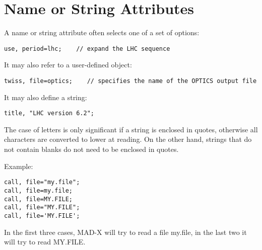 
\section{Name or String Attributes}
\label{sec:name}

A name or string attribute often selects one of a set of options: 
\begin{verbatim}
use, period=lhc;    // expand the LHC sequence
\end{verbatim} 

It may also refer to a user-defined object: 
\begin{verbatim}
twiss, file=optics;    // specifies the name of the OPTICS output file
\end{verbatim} 

It may also define a string: 
\begin{verbatim}
title, "LHC version 6.2";
\end{verbatim} 

The case of letters is only significant if a string is enclosed in
quotes, otherwise all characters are converted to lower at reading. On
the other hand, strings that do not contain blanks do not need to be
enclosed in quotes. 

Example:
\begin{verbatim}
call, file="my.file";
call, file=my.file;
call, file=MY.FILE;
call, file="MY.FILE";
call, file='MY.FILE';
\end{verbatim} 
In the first three cases, MAD-X will try to read a file my.file, in the
last two it will try to read MY.FILE.  

